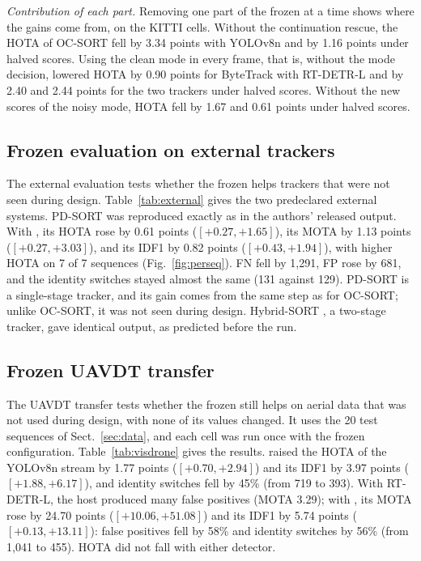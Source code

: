 \emph{Contribution of each part.} Removing one part of the frozen \scl{} at a time shows where the
gains come from, on the KITTI cells. Without the continuation rescue, the HOTA of OC-SORT fell by
3.34 points with YOLOv8n and by 1.16 points under halved scores. Using the clean mode in every
frame, that is, without the mode decision, lowered HOTA by 0.90 points for ByteTrack with RT-DETR-L
and by 2.40 and 2.44 points for the two trackers under halved scores. Without the new scores of the
noisy mode, HOTA fell by 1.67 and 0.61 points under halved scores.




\subsection{Frozen evaluation on external trackers}\label{sec:external}
The external evaluation tests whether the frozen \scl{} helps trackers that were not seen during
design. Table~\ref{tab:external} gives the two predeclared external systems. PD-SORT
\cite{wang2025pdsort} was reproduced exactly as in the authors' released output. With \scl{}, its
HOTA rose by 0.61 points ($[+0.27,+1.65]$), its MOTA by 1.13 points ($[+0.27,+3.03]$), and its IDF1
by 0.82 points ($[+0.43,+1.94]$), with higher HOTA on 7 of 7 sequences (Fig.~\ref{fig:perseq}). FN
fell by 1,291, FP rose by 681, and the identity switches stayed almost the same (131 against 129).
PD-SORT is a single-stage tracker, and its gain comes from the same step as for OC-SORT; unlike
OC-SORT, it was not seen during design. Hybrid-SORT \cite{yang2024hybridsort}, a two-stage tracker,
gave identical output, as predicted before the run.



\subsection{Frozen UAVDT transfer}\label{sec:visdrone}
The UAVDT transfer tests whether the frozen \scl{} still helps on aerial data that was not used
during design, with none of its values changed. It uses the 20 test sequences of
Sect.~\ref{sec:data}, and each cell was run once with the frozen configuration.
Table~\ref{tab:visdrone} gives the results. \scl{} raised the HOTA of the YOLOv8n stream by 1.77
points ($[+0.70,+2.94]$) and its IDF1 by 3.97 points ($[+1.88,+6.17]$), and identity switches fell
by 45\% (from 719 to 393). With RT-DETR-L, the host produced many false positives (MOTA 3.29); with
\scl{}, its MOTA rose by 24.70 points ($[+10.06,+51.08]$) and its IDF1 by 5.74 points
($[+0.13,+13.11]$): false positives fell by 58\% and identity switches by 56\% (from 1,041 to 455).
HOTA did not fall with either detector.


